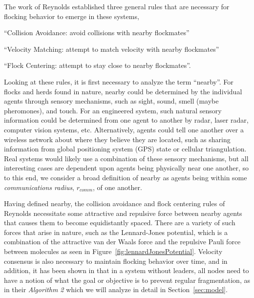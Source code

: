 \documentclass[10pt, conference]{IEEEtran}
\begin{document}
The work of Reynolds \cite{Reynolds1987} established three general rules that are necessary for flocking behavior to emerge in these systems, \begin{inparaenum}[\itshape 1\upshape)]\item ``Collision Avoidance: avoid collisions with nearby flockmates'' \item ``Velocity Matching: attempt to match velocity with nearby flockmates'' \item ``Flock Centering: attempt to stay close to nearby flockmates''. \end{inparaenum}
%
Looking at these rules, it is first necessary to analyze the term ``nearby''.  For flocks and herds found in nature, nearby could be determined by the individual agents through sensory mechanisms, such as sight, sound, smell (maybe pheromones), and touch.
%
For an engineered system, such natural sensory information could be determined from one agent to another by radar, laser radar, computer vision systems, etc.
%
Alternatively, agents could tell one another over a wireless network about where they believe they are located, such as sharing information from global positioning system (GPS) state or cellular triangulation.
%
Real systems would likely use a combination of these sensory mechanisms, but all interesting cases are dependent upon agents being physically near one another, so to this end, we consider a broad definition of nearby as agents being within some \textit{communications radius}, $r_{comm}$, of one another.

Having defined nearby, the collision avoidance and flock centering rules of Reynolds necessitate some attractive and repulsive force between nearby agents that causes them to become equidistantly spaced.
%
There are a variety of such forces that arise in nature, such as the Lennard-Jones potential, which is a combination of the attractive van der Waals force and the repulsive Pauli force between molecules \cite{Jones1924} as seen in Figure~\ref{fig:lennardJonesPotential}.
%
Velocity consensus is also necessary to maintain flocking behavior over time, and in addition, it has been shown in \cite{os2006} that in a system without leaders, all nodes need to have a notion of what the goal or objective is to prevent regular fragmentation, as in their \textit{Algorithm 2} which we will analyze in detail in Section~\ref{sec:model}.
\end{document}
